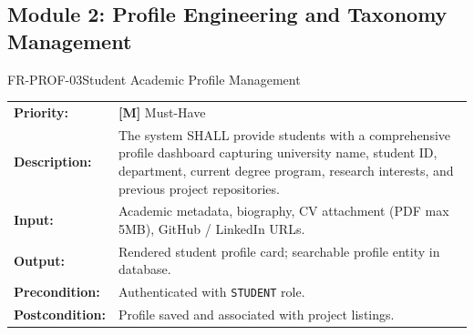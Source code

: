\documentclass[11pt,a4paper]{article}
\begin{document}
\subsection{Module 2: Profile Engineering and Taxonomy Management}

\begin{reqbox}{FR-PROF-03}{Student Academic Profile Management}
\begin{tabularx}{\textwidth}{@{}lX@{}}
\textbf{Priority:} & \textbf{[M]} Must-Have \\
\textbf{Description:} & The system SHALL provide students with a comprehensive profile dashboard capturing university name, student ID, department, current degree program, research interests, and previous project repositories. \\
\textbf{Input:} & Academic metadata, biography, CV attachment (PDF max 5MB), GitHub / LinkedIn URLs. \\
\textbf{Output:} & Rendered student profile card; searchable profile entity in database. \\
\textbf{Precondition:} & Authenticated with \texttt{STUDENT} role. \\
\textbf{Postcondition:} & Profile saved and associated with project listings. \\
\end{tabularx}
\end{reqbox}
\end{document}
